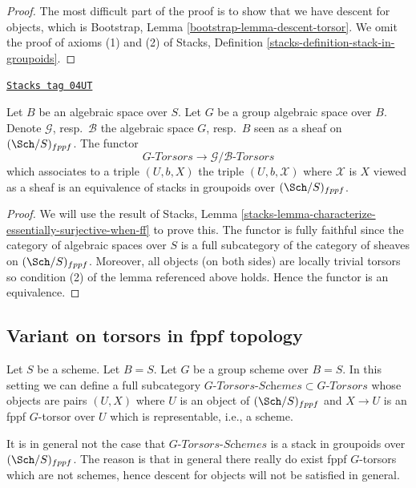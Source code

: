 \begin{proof}
The most difficult part of the proof is to show that we have descent for
objects, which is
Bootstrap, Lemma \ref{bootstrap-lemma-descent-torsor}.
We omit the proof of axioms (1) and (2) of
Stacks, Definition \ref{stacks-definition-stack-in-groupoids}.
\end{proof}

\begin{lemma}
\label{examples-stacks-lemma-compare-torsors}
\href{https://stacks.math.columbia.edu/tag/04UT}{\texttt{Stacks tag 04UT}}

Let $B$ be an algebraic space over $S$. Let $G$ be a group algebraic
space over $B$. Denote $\mathcal{G}$, resp.\ $\mathcal{B}$ the algebraic
space $G$, resp.\ $B$ seen as a sheaf on $(\Sch/S)_{fppf}$.
The functor
$$
G\textit{-Torsors} \longrightarrow \mathcal{G}/\mathcal{B}\textit{-Torsors}
$$
which associates to a triple $(U, b, X)$ the triple
$(U, b, \mathcal{X})$ where $\mathcal{X}$ is $X$ viewed as a sheaf
is an equivalence of stacks in groupoids over $(\Sch/S)_{fppf}$.
\end{lemma}

\begin{proof}
We will use the result of
Stacks, Lemma \ref{stacks-lemma-characterize-essentially-surjective-when-ff}
to prove this. The functor is fully faithful since the category of
algebraic spaces over $S$ is a full subcategory of the category of
sheaves on $(\Sch/S)_{fppf}$.
Moreover, all objects (on both sides) are locally trivial torsors
so condition (2) of the lemma referenced above holds.
Hence the functor is an equivalence.
\end{proof}


\subsection{Variant on torsors in fppf topology}
\label{examples-stacks-subsection-variant-fppf-torsors}

Let $S$ be a scheme. Let $B = S$.
Let $G$ be a group scheme over $B = S$.
In this setting we can define a full subcategory
$G\textit{-Torsors-Schemes} \subset G\textit{-Torsors}$
whose objects are pairs $(U, X)$ where $U$ is an object of
$(\Sch/S)_{fppf}$ and $X \to U$ is an fppf
$G$-torsor over $U$ which is representable, i.e., a scheme.

\medskip\noindent
It is in general not the case that $G\textit{-Torsors-Schemes}$ is
a stack in groupoids over $(\Sch/S)_{fppf}$. The reason is
that in general there really do exist fppf $G$-torsors
which are not schemes, hence descent for objects will not be satisfied
in general.

